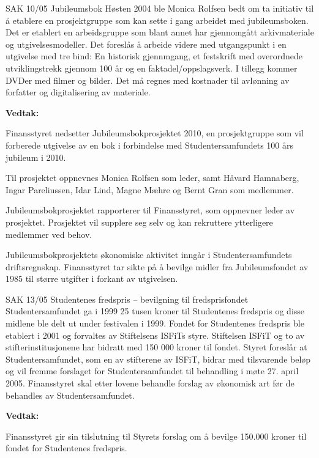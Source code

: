 \documentclass[fsbok.tex]{subfiles}
\begin{document}
\begin{instruksledd}{SAK 10/05 Jubileumsbok}
    Høsten 2004 ble Monica Rolfsen bedt om ta initiativ til å etablere en prosjektgruppe
    som kan sette i gang arbeidet
    med jubileumsboken. Det er etablert en arbeidsgruppe som blant annet har gjennomgått
    arkivmateriale og
    utgivelsesmodeller. Det foreslås å arbeide videre med utgangspunkt i en utgivelse med
    tre bind: En historisk
    gjennmgang, et festskrift med overordnede utviklingstrekk gjennom 100 år og en
    faktadel/oppslagsverk. I tillegg
    kommer DVDer med filmer og bilder. Det må regnes med kostnader til avlønning av
    forfatter og digitalisering av
    materiale.
    
    
    \textbf{Vedtak:}

    Finansstyret nedsetter Jubileumsbokprosjektet 2010, en prosjektgruppe som vil
    forberede utgivelse av en bok i
    forbindelse med Studentersamfundets 100 års jubileum i 2010.
    
    Til prosjektet oppnevnes Monica Rolfsen som leder, samt Håvard Hamnaberg, Ingar
    Pareliussen, Idar Lind, Magne
    Mæhre og Bernt Gran som medlemmer.
    
    Jubileumsbokprosjektet rapporterer til Finansstyret, som oppnevner leder av
    prosjektet. Prosjektet vil supplere seg
    selv og kan rekruttere ytterligere medlemmer ved behov.
    
    Jubileumsbokprosjektets økonomiske aktivitet inngår i Studentersamfundets
    driftsregnskap. Finansstyret tar sikte på å
    bevilge midler fra Jubileumsfondet av 1985 til større utgifter i forkant av
    utgivelsen.


\end{instruksledd}

\begin{instruksledd}{SAK 13/05 Studentenes fredspris – bevilgning til fredsprisfondet}
    Studentersamfundet ga i 1999 25 tusen kroner til Studentenes fredspris og disse
    midlene ble delt ut under festivalen i
    1999. Fondet for Studentenes fredspris ble etablert i 2001 og forvaltes av Stiftelsens
    ISFiTs styre. Stiftelsen ISFiT og
    to av stifterinstitusjonene har bidratt med 150 000 kroner til fondet. Styret foreslår
    at Studentersamfundet, som en av
    stifterene av ISFiT, bidrar med tilsvarende beløp og vil fremme forslaget for
    Studentersamfundet til behandling i møte
    27. april 2005. Finansstyret skal etter lovene behandle forslag av økonomisk art før
    de behandles av
    Studentersamfundet.
    
    \textbf{Vedtak:}

    Finansstyret gir sin tilslutning til Styrets forslag om å bevilge 150.000 kroner til
    fondet for Studentenes fredspris.

\end{instruksledd}
\end{document}
